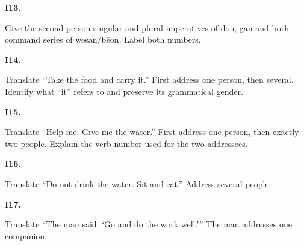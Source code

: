 \par\begin{minipage}{\linewidth}\raggedright
\textbf{I13.}

Give the second-person singular and plural imperatives of dōn, gān and both command series of wesan/\allowbreak{}bēon. Label both numbers.

\end{minipage}\par\addvspace{4pt}

\par\begin{minipage}{\linewidth}\raggedright
\textbf{I14.}

Translate “Take the food and carry it.” First address one person, then several. Identify what “it” refers to and preserve its grammatical gender.

\end{minipage}\par\addvspace{4pt}

\par\begin{minipage}{\linewidth}\raggedright
\textbf{I15.}

Translate “Help me. Give me the water.” First address one person, then exactly two people. Explain the verb number used for the two addressees.

\end{minipage}\par\addvspace{4pt}

\par\begin{minipage}{\linewidth}\raggedright
\textbf{I16.}

Translate “Do not drink the water. Sit and eat.” Address several people.

\end{minipage}\par\addvspace{4pt}

\par\begin{minipage}{\linewidth}\raggedright
\textbf{I17.}

Translate “The man said: ‘Go and do the work well.’” The man addresses one companion.

\end{minipage}\par\addvspace{4pt}

